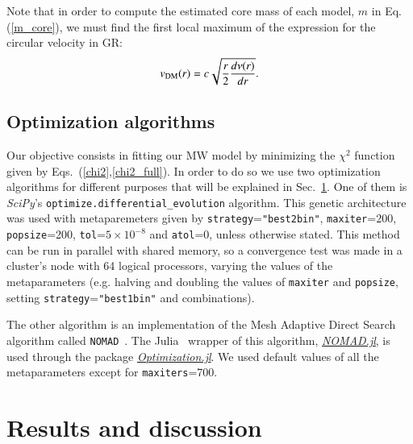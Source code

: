 \documentclass[twocolumn]{aa}
\begin{document}
Note that in order to compute the estimated core mass of each model, $m$ in Eq.(\ref{m_core}),
we must find the first local maximum of the expression for the circular velocity in GR:
\begin{equation}
   \label{v_circ_dm}
   v_{\rm{DM}}(r)= c\sqrt{\frac{r}{2}\frac{d\nu(r)}{dr}}.
\end{equation}

\subsection{Optimization algorithms}
\label{sec:optimization}

Our objective consists in fitting our MW model by minimizing the $\chi^2$ function given by Eqs.~(\ref{chi2},\ref{chi2_full}).  In order to do so we use two optimization algorithms for different purposes
that will be explained in Sec.~\ref{sec:results}.
One of them is {\it SciPy}'s
\texttt{optimize.differential\_evolution} algorithm. This genetic architecture
was used with metaparemeters given by
\texttt{strategy}=\texttt{"best2bin"}, \texttt{maxiter}=200, \texttt{popsize}=200,
\texttt{tol}=$5\times10^{-8}$ and \texttt{atol}=0, unless otherwise stated. This method can be run in parallel with shared memory,
so a convergence test was made in a cluster's node with 64 logical processors, varying the values of the metaparameters (e.g. halving and doubling the values of \texttt{maxiter} and \texttt{popsize}, setting \texttt{strategy}=\texttt{"best1bin"} and combinations).

The other algorithm is an implementation of the Mesh Adaptive Direct Search algorithm called
\texttt{NOMAD}~\citep{audet2021nomad}. The {\sc Julia}~\citep{bezanson2017julia}
wrapper of this algorithm, \href{https://bbopt.github.io/NOMAD.jl/stable/}{\it NOMAD.jl},
is used through the package \href{https://docs.sciml.ai/Optimization/stable/}{\it Optimization.jl}.
We used default values of all the metaparameters except for \texttt{maxiters}=700.




\section{Results and discussion}
\label{sec:results}
\end{document}
